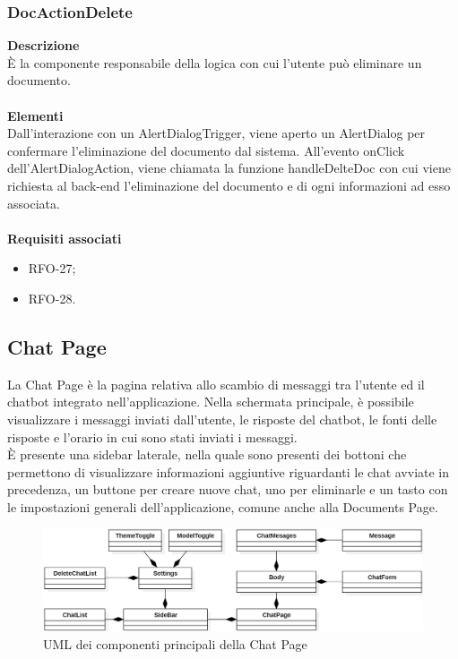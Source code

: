 \subsubsection{DocActionDelete}
\textbf{Descrizione}\\
È la componente responsabile della logica con cui l'utente può eliminare un documento.\\ \\
\textbf{Elementi}\\
Dall'interazione con un AlertDialogTrigger, viene aperto un AlertDialog per confermare l'eliminazione del documento dal sistema. All'evento onClick dell'AlertDialogAction, viene chiamata la funzione handleDelteDoc con cui viene richiesta al back-end l'eliminazione del documento e di ogni informazioni ad esso associata.\\ \\
\textbf{Requisiti associati}
\begin{itemize}[itemsep=-4pt]
    \item RFO-27;
    \item RFO-28.
\end{itemize}

\newpage

\subsection{Chat Page}
La Chat Page è la pagina relativa allo scambio di messaggi tra l'utente ed il chatbot integrato nell'applicazione. Nella schermata principale, è possibile visualizzare i messaggi inviati dall'utente, le risposte del chatbot, le fonti delle risposte e l'orario in cui sono stati inviati i messaggi. \\
È presente una sidebar laterale, nella quale sono presenti dei bottoni che permettono di visualizzare informazioni aggiuntive riguardanti le chat avviate in precedenza, un buttone per creare nuove chat, uno per eliminarle e un tasto con le impostazioni generali dell'applicazione, comune anche alla Documents Page.
\begin{figure}[h!]
    \centering  
    \includegraphics[width=\textwidth]{ChatPageView.png}
    \caption{UML dei componenti principali della Chat Page} 
\end{figure}

